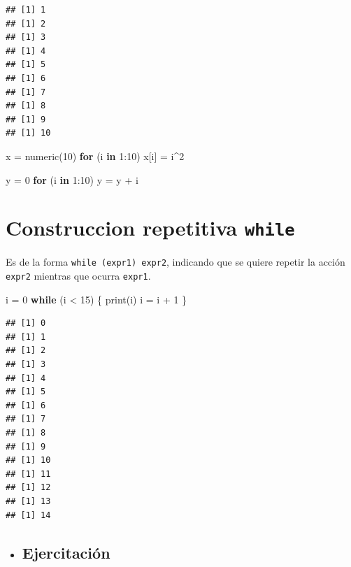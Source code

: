 \documentclass[
]{book}
\newenvironment{Shaded}{\begin{snugshade}}{\end{snugshade}}
\newcommand{\ControlFlowTok}[1]{\textcolor[rgb]{0.13,0.29,0.53}{\textbf{#1}}}
\newcommand{\DecValTok}[1]{\textcolor[rgb]{0.00,0.00,0.81}{#1}}
\newcommand{\FunctionTok}[1]{\textcolor[rgb]{0.00,0.00,0.00}{#1}}
\newcommand{\NormalTok}[1]{#1}
\newcommand{\OtherTok}[1]{\textcolor[rgb]{0.56,0.35,0.01}{#1}}
\newcommand{\SpecialCharTok}[1]{\textcolor[rgb]{0.00,0.00,0.00}{#1}}
\newenvironment{rmdblock}[1]
{\begin{shaded*}
		\begin{itemize}
			\renewcommand{\labelitemi}{
				\raisebox{-.7\height}[0pt][0pt]{
					{\setkeys{Gin}{width=3em,keepaspectratio}\texttt{[image: images/\#1]}}
				}
			}
			\item
		}
		{
		\end{itemize}
	\end{shaded*}
}
\newenvironment{rmdtip}
{\begin{rmdblock}{tip}}
	{\end{rmdblock}}
\begin{document}
\begin{verbatim}
## [1] 1
## [1] 2
## [1] 3
## [1] 4
## [1] 5
## [1] 6
## [1] 7
## [1] 8
## [1] 9
## [1] 10
\end{verbatim}

\begin{Shaded}
\begin{Highlighting}[]
\NormalTok{x }\OtherTok{=} \FunctionTok{numeric}\NormalTok{(}\DecValTok{10}\NormalTok{)}
\ControlFlowTok{for}\NormalTok{ (i }\ControlFlowTok{in} \DecValTok{1}\SpecialCharTok{:}\DecValTok{10}\NormalTok{) x[i] }\OtherTok{=}\NormalTok{ i}\SpecialCharTok{\^{}}\DecValTok{2}

\NormalTok{y }\OtherTok{=} \DecValTok{0}
\ControlFlowTok{for}\NormalTok{ (i }\ControlFlowTok{in} \DecValTok{1}\SpecialCharTok{:}\DecValTok{10}\NormalTok{) y }\OtherTok{=}\NormalTok{ y }\SpecialCharTok{+}\NormalTok{ i}
\end{Highlighting}
\end{Shaded}

\hypertarget{construccion-repetitiva-while}{%
\section{\texorpdfstring{Construccion repetitiva \texttt{while}}{Construccion repetitiva while}}\label{construccion-repetitiva-while}}

Es de la forma \texttt{while\ (expr1)\ expr2}, indicando que se quiere repetir la
acción \texttt{expr2} mientras que ocurra \texttt{expr1}.

\begin{Shaded}
\begin{Highlighting}[]
\NormalTok{i }\OtherTok{=} \DecValTok{0}
\ControlFlowTok{while}\NormalTok{ (i }\SpecialCharTok{\textless{}} \DecValTok{15}\NormalTok{) \{}
  \FunctionTok{print}\NormalTok{(i)}
\NormalTok{  i }\OtherTok{=}\NormalTok{ i }\SpecialCharTok{+} \DecValTok{1}
\NormalTok{\}}
\end{Highlighting}
\end{Shaded}

\begin{verbatim}
## [1] 0
## [1] 1
## [1] 2
## [1] 3
## [1] 4
## [1] 5
## [1] 6
## [1] 7
## [1] 8
## [1] 9
## [1] 10
## [1] 11
## [1] 12
## [1] 13
## [1] 14
\end{verbatim}

\begin{rmdtip}
\hypertarget{ejercitaciuxf3n}{%
\subsection{Ejercitación}\label{ejercitaciuxf3n}}
\end{rmdtip}
\end{document}
